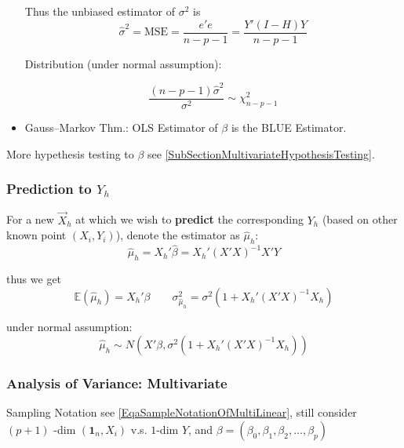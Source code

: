 \begin{itemize}[topsep=2pt,itemsep=2pt]
    
    
    Thus the unbiased estimator of $ \sigma ^2 $ is 
    \begin{equation}
        \hat{\sigma }^2=\mathrm{MSE}=\dfrac{e'e}{n-p-1}=\dfrac{Y'(I-H)Y}{n-p-1}
    \end{equation}

    Distribution (under normal assumption):
    
    \begin{equation}\label{EqaDistributionOfMultiVariateSigma}
        \dfrac{(n-p-1)\hat{\sigma }^2}{\sigma ^2}\sim \chi^2_{n-p-1}
    \end{equation}
    
    \item Gauss–Markov Thm.: OLS Estimator of $ \beta  $ is the BLUE Estimator.
\end{itemize}

\noindent More hypethesis testing to $ \beta  $ see \autoref{SubSectionMultivariateHypothesisTesting}.



\subsubsection{Prediction to $ Y_h $}
    For a new $ \vec{X}_h $ at which we wish to \textbf{predict }the corresponding $ Y_h $ (based on other known point $ (X_i,Y_i) $), denote the estimator as $ \hat{\mu}_h $:
    \begin{equation}
        \hat{\mu }_h=X_h'\hat{\beta }=X_h'(X'X)^{-1}X'Y
    \end{equation}
    
    thus we get 
    \begin{equation}
        \mathbb{E}(\hat{\mu }_h)= X_h'\beta  \qquad \sigma ^2_{\hat{\mu}_h}=\sigma ^2(1+X_h'(X'X)^{-1}X_h)
    \end{equation}

    under normal assumption:
    \begin{equation}
        \hat{\mu}_h\sim N(X'\beta,\sigma ^2(1+X_h'(X'X)^{-1}X_h))
    \end{equation}
    
    
    
    
    

    

\subsubsection{Analysis of Variance: Multivariate}
    Sampling Notation see \autoref{EqaSampleNotationOfMultiLinear}, still consider $ (p+1) $ -dim $ (\mathbf{1}_n,X_i) $ v.s. $ 1 $-dim $ Y $, and $ \beta=(\beta _0,\beta _1,\beta _2,\ldots,\beta _p) $

